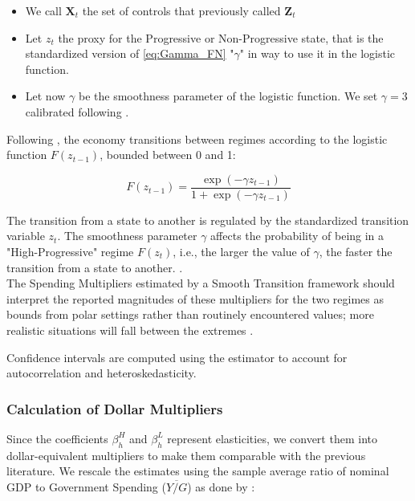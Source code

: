 \documentclass[12pt,letterpaper]{article}
\begin{document}
\begin{itemize}
    \item We call $\bm{X}_t$ the set of controls that \cite{FN} previously called $\bm{Z}_t$
    \item Let $z_t$ the proxy for the Progressive or Non-Progressive state, that is the standardized version of \eqref{eq:Gamma_FN} "$\gamma$" in way to use it in the logistic function.
    \item Let now $\gamma$ be the smoothness parameter of the logistic function. We set $\gamma=3$ calibrated following \cite{Auerbach_Gorodnichenko_2012_Measuring}.
\end{itemize}

Following \cite{GrangerTerasvirtaAnderson1993}, the economy transitions between regimes according to the logistic function $F(z_{t-1})$, bounded between 0 and 1:

\begin{equation}
    F(z_{t-1}) = \frac{\exp(-\gamma z_{t-1})}{1 + \exp(-\gamma z_{t-1})}
    \label{eq:Smooth_Transiction_Function}
\end{equation}

The transition from a state to another is regulated by the standardized transition variable $z_t$. The smoothness parameter $\gamma$ affects the probability of being in a "High-Progressive" regime $F(z_t)$, i.e., the larger the value of $\gamma$, the faster the transition from a state to another. \cite{CaggianoCastelnuovo_NonLinear}.
\\
The Spending Multipliers estimated by a Smooth Transition framework should interpret the reported magnitudes of these multipliers for the two regimes as bounds from polar settings rather than routinely encountered values; more realistic situations will fall between the extremes \cite{Auerbach_Gorodnichenko_2012_Measuring}.

Confidence intervals are computed using the \cite{NeweyWest1987} estimator to account for autocorrelation and heteroskedasticity.

\subsubsection{Calculation of Dollar Multipliers}
Since the coefficients $\beta^H_{h}$ and $\beta^L_{h}$ represent elasticities, we convert them into dollar-equivalent multipliers to make them comparable with the previous literature. We rescale the estimates using the sample average ratio of nominal GDP to Government Spending ($\overline{Y/G}$) as done by \cite{RameyZubairy2018,Auerbach_Gorodnichenko_2012_Measuring,CaggianoCastelnuovo_NonLinear}:
\end{document}

